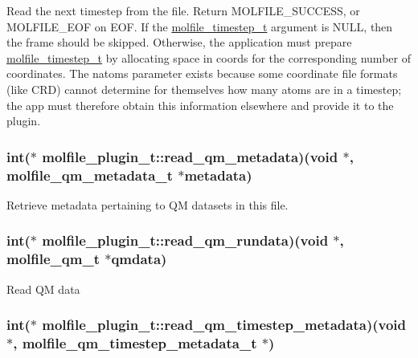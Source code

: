 \-Read the next timestep from the file. \-Return \-M\-O\-L\-F\-I\-L\-E\-\_\-\-S\-U\-C\-C\-E\-S\-S, or \-M\-O\-L\-F\-I\-L\-E\-\_\-\-E\-O\-F on \-E\-O\-F. \-If the \hyperlink{structmolfile__timestep__t}{molfile\-\_\-timestep\-\_\-t} argument is \-N\-U\-L\-L, then the frame should be skipped. \-Otherwise, the application must prepare \hyperlink{structmolfile__timestep__t}{molfile\-\_\-timestep\-\_\-t} by allocating space in coords for the corresponding number of coordinates. \-The natoms parameter exists because some coordinate file formats (like \-C\-R\-D) cannot determine for themselves how many atoms are in a timestep; the app must therefore obtain this information elsewhere and provide it to the plugin. \hypertarget{structmolfile__plugin__t_a918c88a4b1455e114b0c4008d8c77823}{
\subsubsection[{read\-\_\-qm\-\_\-metadata}]{\setlength{\rightskip}{0pt plus 5cm}int($\ast$  {\bf molfile\-\_\-plugin\-\_\-t\-::read\-\_\-qm\-\_\-metadata})({\bf void} $\ast$, {\bf molfile\-\_\-qm\-\_\-metadata\-\_\-t} $\ast$metadata)}}\label{structmolfile__plugin__t_a918c88a4b1455e114b0c4008d8c77823}
\-Retrieve metadata pertaining to \-Q\-M datasets in this file. \hypertarget{structmolfile__plugin__t_a66b4938d266f03b30e38cc8bed9ad473}{
\subsubsection[{read\-\_\-qm\-\_\-rundata}]{\setlength{\rightskip}{0pt plus 5cm}int($\ast$  {\bf molfile\-\_\-plugin\-\_\-t\-::read\-\_\-qm\-\_\-rundata})({\bf void} $\ast$, {\bf molfile\-\_\-qm\-\_\-t} $\ast$qmdata)}}\label{structmolfile__plugin__t_a66b4938d266f03b30e38cc8bed9ad473}
\-Read \-Q\-M data \hypertarget{structmolfile__plugin__t_a4928ec6da0a4e956c5bd4edeea429c57}{
\subsubsection[{read\-\_\-qm\-\_\-timestep\-\_\-metadata}]{\setlength{\rightskip}{0pt plus 5cm}int($\ast$  {\bf molfile\-\_\-plugin\-\_\-t\-::read\-\_\-qm\-\_\-timestep\-\_\-metadata})({\bf void} $\ast$, {\bf molfile\-\_\-qm\-\_\-timestep\-\_\-metadata\-\_\-t} $\ast$)}}\label{structmolfile__plugin__t_a4928ec6da0a4e956c5bd4edeea429c57}
